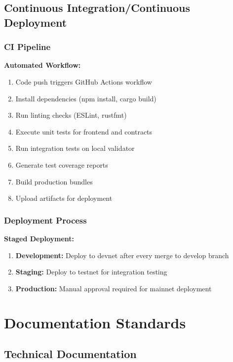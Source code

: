 \documentclass[a4paper,13pt,twoside]{report}
\theoremstyle{definition}
\begin{document}
\subsection{Continuous Integration/Continuous Deployment}

\subsubsection{CI Pipeline}

\textbf{Automated Workflow:}
\begin{enumerate}
    \item Code push triggers GitHub Actions workflow
    \item Install dependencies (npm install, cargo build)
    \item Run linting checks (ESLint, rustfmt)
    \item Execute unit tests for frontend and contracts
    \item Run integration tests on local validator
    \item Generate test coverage reports
    \item Build production bundles
    \item Upload artifacts for deployment
\end{enumerate}

\subsubsection{Deployment Process}

\textbf{Staged Deployment:}
\begin{enumerate}
    \item \textbf{Development:} Deploy to devnet after every merge to develop branch
    \item \textbf{Staging:} Deploy to testnet for integration testing
    \item \textbf{Production:} Manual approval required for mainnet deployment
\end{enumerate}

\section{Documentation Standards}

\subsection{Technical Documentation}
\end{document}
